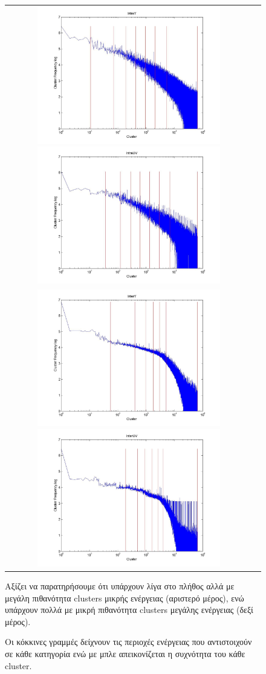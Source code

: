  \begin{figure}[h]
\centering
\begin{tabular}{c c}
    \includegraphics[height=6.0cm]{chapter4/IntraY.jpg}
    \includegraphics[height=6.0cm]{chapter4/IntraUV.jpg}\\
    \includegraphics[height=6.0cm]{chapter4/InterY.jpg}
    \includegraphics[height=6.0cm]{chapter4/InterUV.jpg}
\end{tabular}
\caption{Οι κόκκινες γραμμές δείχνουν τις περιοχές ενέργειας που αντιστοιχούν σε κάθε κατηγορία ενώ με μπλε απεικονίζεται η συχνότητα του κάθε cluster.} 
\indent Αξίζει να παρατηρήσουμε ότι υπάρχουν λίγα στο πλήθος αλλά με μεγάλη πιθανότητα clusters μικρής ενέργειας (αριστερό μέρος), ενώ υπάρχουν πολλά με μικρή πιθανότητα clusters μεγάλης ενέργειας (δεξί μέρος).

\label{fig:cat}
\end{figure}


